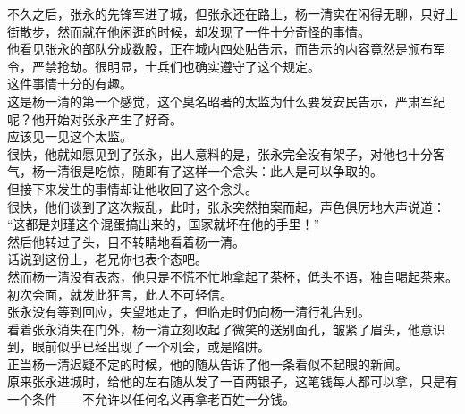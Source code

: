 \begin{multicols}{\theparacolNo}
不久之后，张永的先锋军进了城，但张永还在路上，杨一清实在闲得无聊，只好上街散步，然而就在他闲逛的时候，却发现了一件十分奇怪的事情。\\

他看见张永的部队分成数股，正在城内四处贴告示，而告示的内容竟然是颁布军令，严禁抢劫。很明显，士兵们也确实遵守了这个规定。\\

这件事情十分的有趣。\\

这是杨一清的第一个感觉，这个臭名昭著的太监为什么要发安民告示，严肃军纪呢？他开始对张永产生了好奇。\\

应该见一见这个太监。\\

很快，他就如愿见到了张永，出人意料的是，张永完全没有架子，对他也十分客气，杨一清很是吃惊，随即有了这样一个念头：此人是可以争取的。\\

但接下来发生的事情却让他收回了这个念头。\\

很快，他们谈到了这次叛乱，此时，张永突然拍案而起，声色俱厉地大声说道：\\

“这都是刘瑾这个混蛋搞出来的，国家就坏在他的手里！”\\

然后他转过了头，目不转睛地看着杨一清。\\

话说到这份上，老兄你也表个态吧。\\

然而杨一清没有表态，他只是不慌不忙地拿起了茶杯，低头不语，独自喝起茶来。\\

初次会面，就发此狂言，此人不可轻信。\\

张永没有等到回应，失望地走了，但临走时仍向杨一清行礼告别。\\

看着张永消失在门外，杨一清立刻收起了微笑的送别面孔，皱紧了眉头，他意识到，眼前似乎已经出现了一个机会，或是陷阱。\\

正当杨一清迟疑不定的时候，他的随从告诉了他一条看似不起眼的新闻。\\

原来张永进城时，给他的左右随从发了一百两银子，这笔钱每人都可以拿，只是有一个条件——不允许以任何名义再拿老百姓一分钱。\\


\end{multicols}
